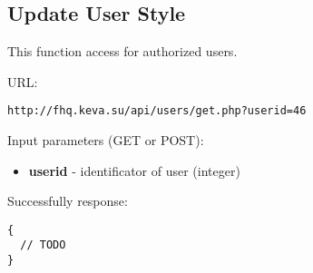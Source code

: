 \subsection{Update User Style}
\par

This function access for authorized users.

URL:
\begin{Verbatim}[frame=single]
http://fhq.keva.su/api/users/get.php?userid=46
\end{Verbatim}

Input parameters (GET or POST):
\begin{itemize}
  \item \textbf{userid} - identificator of user (integer)
\end{itemize}

Successfully response:  \\
\begin{Verbatim}[frame=single]
{
  // TODO
}
\end{Verbatim}

~

